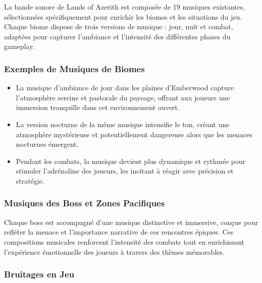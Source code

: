 La bande sonore de Lands of Azerith est composée de 19 musiques existantes, sélectionnées spécifiquement pour enrichir les biomes et les situations du jeu.
\\

Chaque biome dispose de trois versions de musique : jour, nuit et combat, adaptées pour capturer l'ambiance et l'intensité des différentes phases du gameplay.

\subsubsection{Exemples de Musiques de Biomes}

\begin{itemize}

    \item La musique d'ambiance de jour dans les plaines d'Emberwood capture l'atmosphère sereine et pastorale du paysage, offrant aux joueurs une immersion tranquille dans cet environnement ouvert.
          \\

    \item La version nocturne de la même musique intensifie le ton, créant une atmosphère mystérieuse et potentiellement dangereuse alors que les menaces nocturnes émergent.
          \\

    \item Pendant les combats, la musique devient plus dynamique et rythmée pour stimuler l'adrénaline des joueurs, les incitant à réagir avec précision et stratégie.
          \\

\end{itemize}

\subsubsection{Musiques des Boss et Zones Pacifiques}

Chaque boss est accompagné d'une musique distinctive et immersive, conçue pour refléter la menace et l'importance narrative de ces rencontres épiques.
Ces compositions musicales renforcent l'intensité des combats tout en enrichissant l'expérience émotionnelle des joueurs à travers des thèmes mémorables.

\subsubsection{Bruitages en Jeu}

